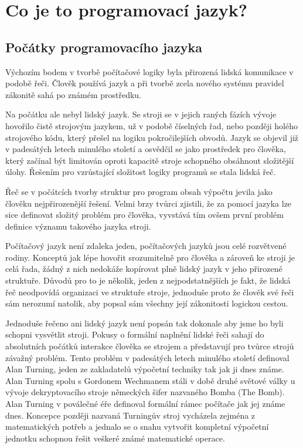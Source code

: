 \documentclass[11pt]{book}
\newcommand{\oddil}[1]{\section{#1}\label{sec:#1}}
\begin{document}
\chapter{Co je to programovací jazyk?}

\oddil{Počátky programovacího jazyka}


Výchozím bodem v tvorbě počítačové logiky byla přirozená lidská komunikace v podobě řeči. Člověk používá jazyk  a při tvorbě zcela nového systému pravidel zákonitě sahá po známém prostředku.

Na počátku ale nebyl lidský jazyk. Se stroji se v jejich raných fázích vývoje hovořilo čistě strojovým jazykem, už v podobě číselných řad, nebo později holého strojového kódu, který přešel na logiku pokročilejších obvodů. Jazyk se objevil již v padesátých letech minulého století a osvědčil se jako prostředek pro člověka, který začínal být limitován oproti kapacitě stroje schopného obsáhnout složitější úlohy. Řešením pro vzrůstající složitost logiky programů se stala lidská řeč.

Řeč se v počátcích tvorby struktur pro program obsah výpočtu jevila jako člověku nejpřirozenější řešení. Velmi brzy tvůrci zjistili, že za pomocí jazyka lze sice definovat složitý problém pro člověka, vyvstává tím ovšem první problém definice významu takového jazyka stroji.

Počítačový jazyk není zdaleka jeden, počítačových jazyků jsou celé rozvětvené rodiny. Konceptů jak lépe hovořit srozumitelně pro člověka a zároveň ke stroji je celá řada, žádný z nich nedokáže kopírovat plně lidský jazyk v jeho přirozené struktuře. Důvodů pro to je několik, jeden z nejpodstatnějších je fakt, že lidská řeč neodpovídá organizaci ve struktuře stroje, jednoduše proto že člověk své řeči sám nerozumí natolik, aby popsal sám všechny její zákonitosti logickou cestou.

Jednoduše řečeno ani lidský jazyk není popsán tak dokonale aby jsme ho byli schopni vysvětlit stroji. Pokusy o formální naplnění lidské řeči sahají do absolutních počátků interakce člověka se strojem a představují pro tvůrce strojů závažný problém. Tento problém v padesátých letech minulého století definoval Alan Turning, jeden ze zakladatelů výpočetní techniky tak jak ji dnes známe. Alan Turning spolu s Gordonem Wechmanem stáli v době druhé světové války u vývoje dekryptovacího stroje německých šifer nazvaného Bomba (The Bomb). Alan Turning v poválečné éře definoval formální rámec počítače jak jej známe dnes. Koncepce později nazvaná Turningův stroj vycházela zejména z matematických potřeb a jednalo se o snahu vytvořit kompletní výpočetní jednotku schopnou řešit veškeré známé matematické operace. 
\end{document}
